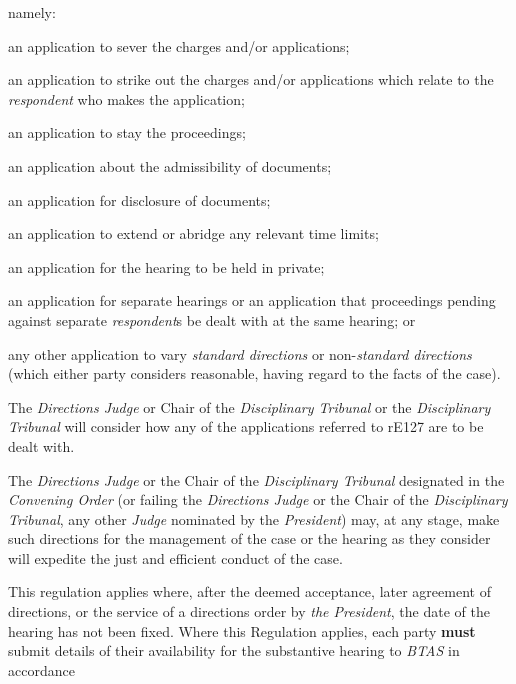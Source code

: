 namely:\\\nl \item an application to sever the charges and/or applications;\item an application to strike out the charges and/or applications which
relate to the \emph{respondent} who makes the application;\item an application to stay the proceedings;\item an application about the admissibility of documents;\item an application for disclosure of documents;\item an application to extend or abridge any relevant time limits;\item an application for the hearing to be held in private;\item an application for separate hearings or an application that
proceedings pending against separate \emph{respondent}s be dealt with at
the same hearing; or\item any other application to vary \emph{standard directions} or
non-\emph{standard directions} (which either party considers reasonable,
having regard to the facts of the case).\ln
{}\par
The \emph{Directions Judge} or Chair of the\emph{ Disciplinary
Tribunal} or the \emph{Disciplinary Tribunal} will consider how any of
the applications referred to rE127 are to be dealt with.\\
\par
{}
The \emph{Directions Judge} or the Chair of the\emph{ Disciplinary
Tribunal} designated in the \emph{Convening Order} (or failing
the \emph{Directions Judge} or the Chair of the\emph{ Disciplinary
Tribunal}, any other \emph{Judge} nominated by the \emph{President})
may, at any stage, make such directions for the management of the case
or the hearing as they consider will expedite the just and efficient
conduct of the case.\\
\par
{}
This regulation applies where, after the deemed acceptance, later
agreement of directions, or the service of a directions order
by \emph{the President}, the date of the hearing has not been fixed.
Where this Regulation applies, each party  \textcolor{myred}{\textbf{must}} submit details of their
availability for the substantive hearing to \emph{BTAS} in accordance
